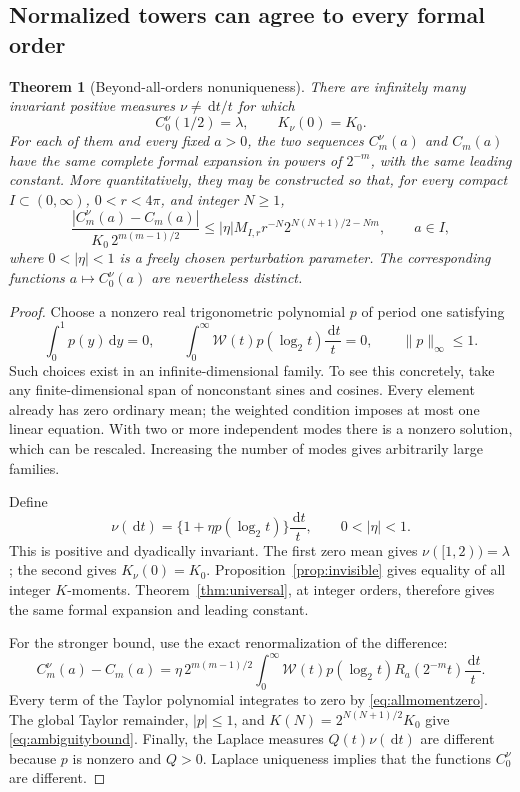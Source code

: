 \documentclass[11pt,letterpaper]{article}
\numberwithin{equation}{section}
\newtheorem{theorem}{Theorem}[section]
\theoremstyle{definition}
\theoremstyle{remark}
\newcommand{\W}{\mathcal W}
\newcommand{\dd}{\,\mathrm d}
\begin{document}
\subsection{Normalized towers can agree to every formal order}
\begin{theorem}[Beyond-all-orders nonuniqueness]\label{thm:ambiguity}
There are infinitely many invariant positive measures $\nu\ne\dd t/t$
for which
\begin{equation}\label{eq:ambiguitynormalizations}
 C_0^\nu(1/2)=\lambda,\qquad K_\nu(0)=K_0.
\end{equation}
For each of them and every fixed $a>0$, the two sequences
$C_m^\nu(a)$ and $C_m(a)$ have the same complete formal expansion in
powers of $2^{-m}$, with the same leading constant.
More quantitatively, they may be constructed so that, for every compact
$I\subset(0,\infty)$, $0<r<4\pi$, and integer $N\ge1$,
\begin{equation}\label{eq:ambiguitybound}
 \frac{|C_m^\nu(a)-C_m(a)|}{K_0\,2^{m(m-1)/2}}
 \le |\eta|M_{I,r}r^{-N}2^{N(N+1)/2-Nm},\qquad a\in I,
\end{equation}
where $0<|\eta|<1$ is a freely chosen perturbation parameter.
The corresponding functions $a\mapsto C_0^\nu(a)$ are nevertheless distinct.
\end{theorem}
\begin{proof}
Choose a nonzero real trigonometric polynomial $p$ of period one satisfying
\begin{equation}\label{eq:twopconditions}
 \int_0^1p(y)\dd y=0,\qquad
 \int_0^\infty\W(t)p(\log_2t)\frac{\dd t}{t}=0,
 \qquad \|p\|_\infty\le1.
\end{equation}
Such choices exist in an infinite-dimensional family. To see this
concretely, take any finite-dimensional span of nonconstant sines and
cosines. Every element already has zero ordinary mean; the weighted
condition imposes at most one linear equation. With two or more
independent modes there is a nonzero solution, which can be rescaled.
Increasing the number of modes gives arbitrarily large families.

Define
\begin{equation}\label{eq:nupperturb}
 \nu(\dd t)=\{1+\eta p(\log_2t)\}\frac{\dd t}{t},
 \qquad0<|\eta|<1.
\end{equation}
This is positive and dyadically invariant. The first zero mean gives
$\nu([1,2))=\lambda$; the second gives $K_\nu(0)=K_0$.
Proposition~\ref{prop:invisible} gives equality of all integer $K$-moments.
Theorem~\ref{thm:universal}, at integer orders, therefore gives the same
formal expansion and leading constant.

For the stronger bound, use the exact renormalization of the difference:
\[
 C_m^\nu(a)-C_m(a)
 =\eta\,2^{m(m-1)/2}\int_0^\infty
       \W(t)p(\log_2t)R_a(2^{-m}t)\frac{\dd t}{t}.
\]
Every term of the Taylor polynomial integrates to zero by
\eqref{eq:allmomentzero}. The global Taylor remainder, $|p|\le1$, and
$K(N)=2^{N(N+1)/2}K_0$ give \eqref{eq:ambiguitybound}.
Finally, the Laplace measures $Q(t)\nu(\dd t)$ are different because
$p$ is nonzero and $Q>0$. Laplace uniqueness implies that the functions
$C_0^\nu$ are different.
\end{proof}
\end{document}
